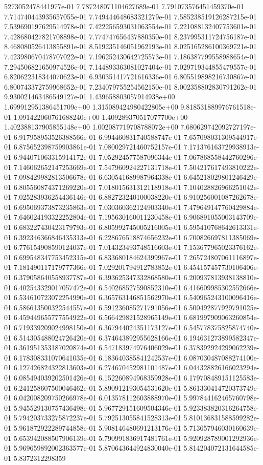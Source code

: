 5273052478441977e-01	7.787248071104627689e-01	7.791073576451459370e-01	7.714740443935657055e-01	7.749444648683321279e-01	7.585238519126287215e-01	7.539690197629514978e-01	7.422256593031063554e-01	7.221088132407753601e-01	7.428680427821708898e-01	7.774747656437880350e-01	8.237995311724756187e-01	8.468080526413855891e-01	8.519235146051962193e-01	8.025165286100369721e-01	7.423980670478707022e-01	7.196252430642725573e-01	7.186387799558988654e-01	7.294506821650974526e-01	7.144893363081027404e-01	7.029719344855479557e-01	6.820622318344070623e-01	6.930351417721616336e-01	6.805519898216730867e-01	6.800743372759968652e-01	7.234079755254562150e-01	8.002358802830791262e-01	9.930021463486549127e-01	1.439658803057914938e+00	1.699912951386451709e+00	1.315089424980422805e+00	9.818531889976761518e-01	1.091422060761688240e+00	1.409289370517077700e+00	1.402388137905855148e+00	1.002087719708788072e+00	7.680629742092727197e-01	6.917958953526388566e-01	6.994460831740588747e-01	7.657098031309544917e-01	6.875652398759903861e-01	7.080029721460752157e-01	7.171376163729938913e-01	6.944071063315914172e-01	7.052924577587096344e-01	7.067868558442760296e-01	7.146062652147253669e-01	7.547960924227131718e-01	7.504217617493810222e-01	7.098429982813506678e-01	6.630541689987964338e-01	6.645218029801246429e-01	6.805560874371269220e-01	7.018015631312118918e-01	7.104028826966251042e-01	7.025283936254436146e-01	6.882723240100038220e-01	6.910256001087262678e-01	6.695069373873235863e-01	7.030360362124903340e-01	7.479649147760429884e-01	7.646024193322252804e-01	7.195630160011230458e-01	6.906891055003143709e-01	6.683227430423179793e-01	6.805992745005216005e-01	6.595410768642613331e-01	6.392346366846435313e-01	6.228676518874656232e-01	6.700826697811385069e-01	6.776154908590124037e-01	7.014323493748516603e-01	7.153677965023376162e-01	6.699548347753452315e-01	6.833680184624399967e-01	7.265724807061116897e-01	7.181490117179777366e-01	7.029201794912783852e-01	6.454157457730106406e-01	6.379058640558937787e-01	6.393625347332868580e-01	6.200937813938138810e-01	6.402543329017057472e-01	6.540268527590852310e-01	6.416609985302552666e-01	6.534610723072254990e-01	6.365763146851562970e-01	6.540965243100096416e-01	6.586613500322544557e-01	6.591236085271791056e-01	6.500492877929791025e-01	6.459449655777554922e-01	6.566429821528965149e-01	6.681997909063260854e-01	6.719339209024998150e-01	6.367944024351173127e-01	6.545778375825874740e-01	6.514305488024726420e-01	6.374643892955628166e-01	6.194631273899582347e-01	6.361951353187020874e-01	6.547183974976406029e-01	6.378392924299062239e-01	6.178308331070641035e-01	6.183640385841242537e-01	6.087030487088274100e-01	6.127426824322813603e-01	6.274670452981101487e-01	6.044328826166023294e-01	6.085494039202501426e-01	6.152260894968359928e-01	6.179708489151125583e-01	6.241258607500046462e-01	5.890912193054531620e-01	5.861330414720373749e-01	6.042008209750266978e-01	6.013578112603888970e-01	5.997844162465760798e-01	5.945529130757436498e-01	5.967729151609504346e-01	5.923383820316264758e-01	5.794203733275872237e-01	5.792513055841528313e-01	5.810136831588599282e-01	5.961872922289744858e-01	5.908146480691213176e-01	5.713657946030160639e-01	5.653942088507906139e-01	5.790991836917481761e-01	5.920928789001292936e-01	5.969659892002363577e-01	5.870643644924830040e-01	5.814204072131644585e-01	5.8372312298359